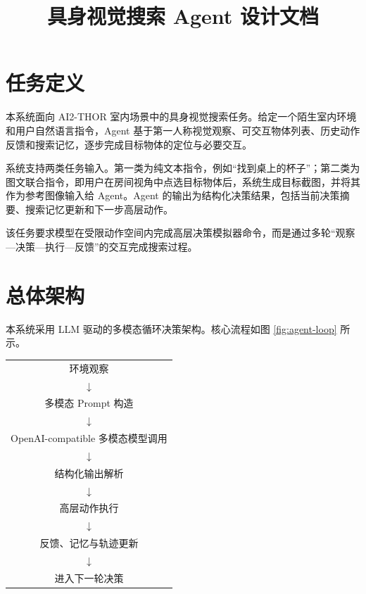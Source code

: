 \documentclass[UTF8,a4paper,12pt]{ctexart}
\title{\textbf{具身视觉搜索 Agent 设计文档}}
\author{}
\date{}
\begin{document}
\maketitle



\section{任务定义}

本系统面向 AI2-THOR 室内场景中的具身视觉搜索任务。给定一个陌生室内环境和用户自然语言指令，Agent 基于第一人称视觉观察、可交互物体列表、历史动作反馈和搜索记忆，逐步完成目标物体的定位与必要交互。

系统支持两类任务输入。第一类为纯文本指令，例如“找到桌上的杯子”；第二类为图文联合指令，即用户在房间视角中点选目标物体后，系统生成目标截图，并将其作为参考图像输入给 Agent。Agent 的输出为结构化决策结果，包括当前决策摘要、搜索记忆更新和下一步高层动作。

该任务要求模型在受限动作空间内完成高层决策模拟器命令，而是通过多轮“观察—决策—执行—反馈”的交互完成搜索过程。

\section{总体架构}

本系统采用 LLM 驱动的多模态循环决策架构。核心流程如图 \ref{fig:agent-loop} 所示。

\begin{center}
\begin{minipage}{0.78\textwidth}
\centering
\begin{tabular}{c}
环境观察 \\
$\downarrow$ \\
多模态 Prompt 构造 \\
$\downarrow$ \\
OpenAI-compatible 多模态模型调用 \\
$\downarrow$ \\
结构化输出解析 \\
$\downarrow$ \\
高层动作执行 \\
$\downarrow$ \\
反馈、记忆与轨迹更新 \\
$\downarrow$ \\
进入下一轮决策
\end{tabular}
\label{fig:agent-loop}
\end{minipage}
\end{center}
\end{document}
